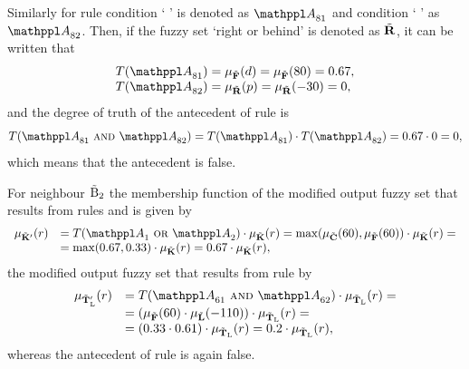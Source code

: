 Similarly for rule  condition `  ' is denoted as $\statement{A}_{81}$ and condition `  ' as $\statement{A}_{82}$. Then, if the fuzzy set `right or behind' is denoted as ${\tilde{{\mathbf{R}}}}$, it can be written that
%
\begin{equation}
\begin{array}{ll}
T(\statement{A}_{81})=\mu_\fset{F}(d)=\mu_\fset{F}(80)=0.67, \\
T(\statement{A}_{82})=\mu_\fset{R}(p)=\mu_\fset{R}(-30)=0,
\end{array}
\end{equation}
%
and the degree of truth of the antecedent of rule  is
%
\begin{equation}
T(\statement{A}_{81}\ \kwd{and}\ \statement{A}_{82})=T(\statement{A}_{81}) \cdot T(\statement{A}_{82})=0.67 \cdot 0 = 0,
\end{equation}
%
which means that the antecedent is false.

For neighbour ${\tilde{\mathrm{B}}}_2$ the membership function of the modified output fuzzy set that results from rules  and  is given by
%
\begin{equation}
\begin{array}{rl}
\mu_{\fset{K}'}(r)&=T(\statement{A}_1\ \kwd{or}\ \statement{A}_2) \cdot \mu_\fset{K}(r)=\max(\mu_\fset{C}(60),\mu_\fset{F}(60)) \cdot \mu_\fset{K}(r)= \\
                  &=\max(0.67,0.33) \cdot \mu_\fset{K}(r)=0.67 \cdot \mu_\fset{K}(r),
\end{array}
\end{equation}
%
the modified output fuzzy set that results from rule  by 
%
\begin{equation}
\begin{array}{rl}
\mu_{{\fset{T}_\mathrm{L}}'}(r)&=T(\statement{A}_{61}\ \kwd{and}\ \statement{A}_{62}) \cdot \mu_{\fset{T}_\mathrm{L}}(r)=\\
                               &=\left(\mu_\fset{F}(60) \cdot \mu_\fset{L}(-110)\right) \cdot \mu_{\fset{T}_\mathrm{L}}(r)=\\
                               &=\left(0.33 \cdot 0.61\right) \cdot \mu_{\fset{T}_\mathrm{L}}(r)=0.2 \cdot \mu_{\fset{T}_\mathrm{L}}(r),
\end{array}
\end{equation}
%
whereas the antecedent of rule  is again false.

